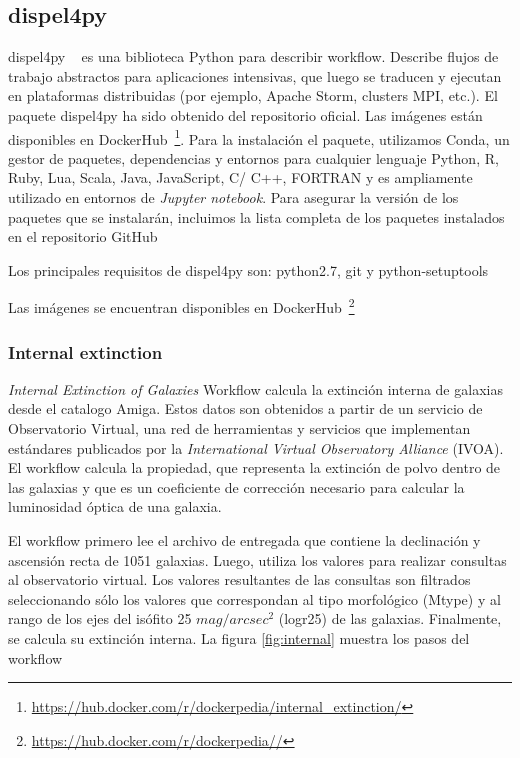 


\subsection{dispel4py}

dispel4py ~\cite{} es una biblioteca Python para describir workflow. Describe flujos de trabajo abstractos para aplicaciones intensivas, que luego se traducen y ejecutan en plataformas distribuidas (por ejemplo, Apache Storm, clusters MPI, etc.).
El paquete dispel4py ha sido obtenido del repositorio oficial. Las imágenes están disponibles en DockerHub~\footnote{\url{https://hub.docker.com/r/dockerpedia/internal_extinction/}}. Para la instalación el paquete, utilizamos Conda, un gestor de paquetes, dependencias y entornos para cualquier lenguaje Python, R, Ruby,
Lua, Scala, Java, JavaScript, C/ C++, FORTRAN y es ampliamente utilizado en entornos de \textit{Jupyter notebook}. Para asegurar la versión de los paquetes que se instalarán, incluimos la lista completa de los paquetes instalados en el repositorio GitHub


Los principales requisitos de dispel4py son: python2.7, git y  python-setuptools


Las imágenes se encuentran disponibles en DockerHub~\footnote{\url{https://hub.docker.com/r/dockerpedia//}}



\subsubsection{Internal extinction}

\textit{Internal Extinction of Galaxies} Workflow calcula la extinción interna de galaxias desde el catalogo Amiga. Estos datos son obtenidos a partir de un servicio de Observatorio Virtual, una red de herramientas y servicios que implementan estándares publicados por la \textit{International Virtual Observatory Alliance} (IVOA). El workflow calcula la propiedad, que representa la extinción de polvo dentro de las galaxias y que es un coeficiente de corrección necesario para calcular la luminosidad óptica de una galaxia.

El workflow primero lee el archivo de entregada que contiene la declinación y ascensión recta de 1051 galaxias. Luego, utiliza los valores para realizar consultas al observatorio virtual. Los valores resultantes de las consultas son filtrados seleccionando sólo los valores que correspondan al tipo morfológico (Mtype) y al rango de los ejes del isófito 25 $mag/arcsec^{2}$ (logr25) de las galaxias. Finalmente, se calcula su extinción interna. La figura \ref{fig:internal} muestra los pasos del workflow

